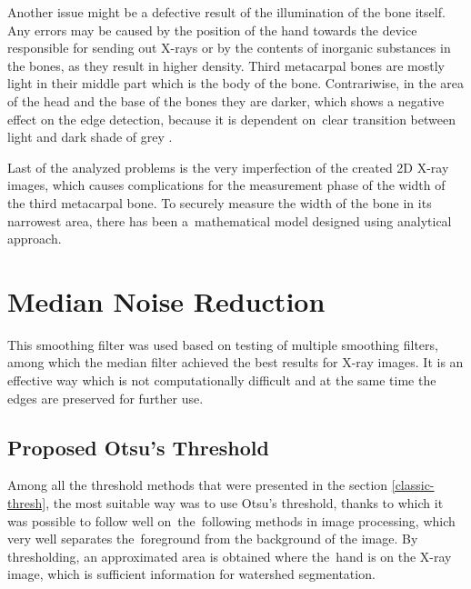Another issue might be a defective result of the illumination of the bone itself. Any errors may be caused by the position of the hand towards the device responsible for sending out X-rays or by the contents of inorganic substances in the bones, as they result in higher density. Third metacarpal bones are mostly light in their middle part which is the body of the bone. Contrariwise, in the area of the head and the base of the bones they are darker, which shows a negative effect on the edge detection, because it is dependent on~clear transition between light and dark shade of grey \cite{metacarpal-structure}.

Last of the analyzed problems is the very imperfection of the created 2D X-ray images, which causes complications for the measurement phase of the width of the third metacarpal bone. To securely measure the width of the bone in its narrowest area, there has been a~mathematical model designed using analytical approach.

\section{Median Noise Reduction}
This smoothing filter was used based on testing of multiple smoothing filters, among which the median filter achieved the best results for X-ray images. It is an effective way which is not computationally difficult and at the same time the edges are preserved for further use.

\subsection{Proposed Otsu's Threshold}
Among all the threshold methods that were presented in the section \ref{classic-thresh}, the most suitable way was to use Otsu's threshold, thanks to which it was possible to follow well on~the~following methods in image processing, which very well separates the~foreground from the background of the image. By thresholding, an approximated area is obtained where the~hand is on the X-ray image, which is sufficient information for watershed segmentation.

